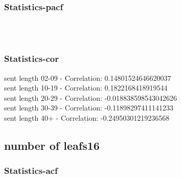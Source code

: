 \documentclass{article}%
\begin{document}
%
\newpage%
\subsubsection{Statistics{-}pacf}%
\label{ssubsec:Statistics{-}pacf}%


\begin{figure}[ht]%
\centering%
\setlength{\abovecaptionskip}{-35pt}%
%
%
\\%
%
%
\\%
%
\end{figure}

%
\newpage%
\subsubsection{Statistics{-}cor}%
\label{ssubsec:Statistics{-}cor}%
\noindent%
sent length 02-09 - Correlation: 0.14801524646620037\\%
sent length 10-19 - Correlation: 0.1822168418919544\\%
sent length 20-29 - Correlation: -0.018838598543042626\\%
sent length 30-39 - Correlation: -0.11898297411141233\\%
sent length 40+ - Correlation: -0.24950301219236568\\

%
\newpage

%
\subsection{number of leafs16}%
\label{subsec:numberofleafs16}%
\subsubsection{Statistics{-}acf}%
\label{ssubsec:Statistics{-}acf}%
\end{document}
